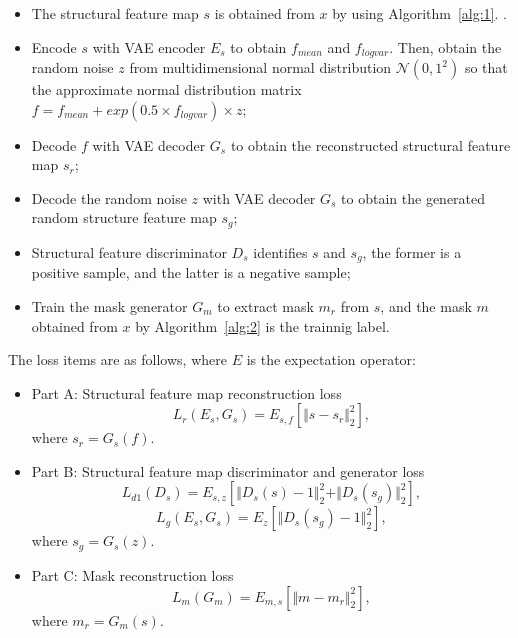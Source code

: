 \documentclass[runningheads]{llncs}
\begin{document}
\begin{itemize}
	\item The structural feature map $s$ is obtained from $x$ by using Algorithm~\ref{alg:1}. .
	\item Encode $s$ with VAE encoder $E_s$ to obtain $f_{mean}$ and $f_{logvar}$. Then, obtain the random noise $z$ from multidimensional normal distribution $\mathcal{N}(0,1^2)$ so that the approximate normal distribution matrix  $f=f_{mean}+exp(0.5\times f_{logvar})\times z$;
	\item Decode $f$ with VAE decoder $G_s$ to obtain the reconstructed structural feature map $s_r$;
	\item Decode the random noise $z$ with VAE decoder $G_s$ to obtain the generated random structure feature map $s_g$;
	\item Structural feature discriminator $D_{s}$ identifies $s$ and $s_g$, the former is a positive sample, and the latter is a negative sample;
	\item Train the mask generator $G_m$ to extract mask $m_r$ from $s$, and the mask $m$ obtained from $x$ by Algorithm~\ref{alg:2} is the trainnig label.
\end{itemize}

The loss items are as follows, where $E$ is the expectation operator: 
\begin{itemize}
	\item{Part A: Structural feature map reconstruction loss} 
	\begin{equation}
	L_{r}(E_s,G_s)=E_{s,f}[\Vert{s-s_r}\Vert_{2}^{2}],
	\end{equation}
	where $s_r=G_s(f)$.
	\item{Part B: Structural feature map discriminator and generator loss} 
	\begin{equation}
	L_{d1}(D_{s})=E_{s,z}[\Vert{D_{s}(s)-1}\Vert_{2}^{2}+\Vert{D_{s}(s_g)}\Vert_{2}^{2}],
	\end{equation}
	\begin{equation}
	L_{g}(E_s,G_s)=E_{z}[\Vert{D_{s}(s_g)-1}\Vert_{2}^{2}],	
	\end{equation}
	where $s_g=G_s(z)$.
	\item{Part C: Mask reconstruction loss}
	\begin{equation}
	L_{m}(G_m)=E_{m,s}[\Vert{m-m_r}\Vert_{2}^{2}],
	\end{equation}
	where $m_r=G_m(s)$.
\end{itemize}
\end{document}
